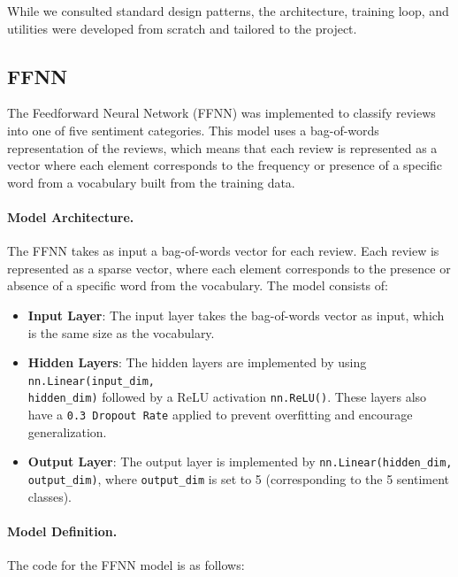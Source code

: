 \documentclass[a4paper]{article}
\begin{document}
While we consulted standard design patterns, the architecture, training loop, and utilities were developed from scratch and tailored to the project.


\subsection*{FFNN}
The Feedforward Neural Network (FFNN) was implemented to classify reviews into one of five sentiment categories. This model uses a bag-of-words representation of the reviews, which means that each review is represented as a vector where each element corresponds to the frequency or presence of a specific word from a vocabulary built from the training data.


\paragraph{Model Architecture.}
The FFNN takes as input a bag-of-words vector for each review. Each review is represented as a sparse vector, where each element corresponds to the presence or absence of a specific word from the vocabulary. The model consists of:

\begin{itemize}
    \item \textbf{Input Layer}: The input layer takes the bag-of-words vector as input, which is the same size as the vocabulary.
    \item \textbf{Hidden Layers}: The hidden layers are implemented by using \texttt{nn.Linear(input\_dim, \\hidden\_dim)} followed by a ReLU activation \texttt{nn.ReLU()}. These layers also have a \texttt{0.3 Dropout Rate} applied to prevent overfitting and encourage generalization.
    \item \textbf{Output Layer}: The output layer is implemented by \texttt{nn.Linear(hidden\_dim, output\_dim)}, where \texttt{output\_dim} is set to 5 (corresponding to the 5 sentiment classes).
\end{itemize}


\paragraph{Model Definition.}
The code for the FFNN model is as follows:
\end{document}

